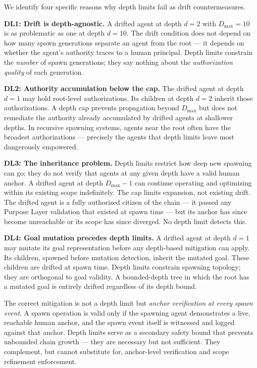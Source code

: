 We identify four specific reasons why depth limits fail as drift countermeasures.

\bigskip
\noindent\textbf{DL1: Drift is depth-agnostic.} A drifted agent at depth $d=2$ with $D_{\max}=10$ is as problematic as one at depth $d=10$. The drift condition does not depend on how many spawn generations separate an agent from the root — it depends on whether the agent's authority traces to a human principal. Depth limits constrain the \emph{number} of spawn generations; they say nothing about the \emph{authorization quality} of each generation.

\bigskip
\noindent\textbf{DL2: Authority accumulation below the cap.} The drifted agent at depth $d=1$ may hold root-level authorizations. Its children at depth $d=2$ inherit those authorizations. A depth cap prevents propagation beyond $D_{\max}$ but does not remediate the authority already accumulated by drifted agents at shallower depths. In recursive spawning systems, agents near the root often have the broadest authorizations — precisely the agents that depth limits leave most dangerously empowered.

\bigskip
\noindent\textbf{DL3: The inheritance problem.} Depth limits restrict how deep new spawning can go; they do not verify that agents at any given depth have a valid human anchor. A drifted agent at depth $D_{\max}-1$ can continue operating and optimizing within its existing scope indefinitely. The cap limits expansion, not existing drift. The drifted agent is a fully authorized citizen of the chain — it passed any Purpose Layer validation that existed at spawn time — but its anchor has since become unreachable or its scope has since diverged. No depth limit detects this.

\bigskip
\noindent\textbf{DL4: Goal mutation precedes depth limits.} A drifted agent at depth $d=1$ may mutate its goal representation before any depth-based mitigation can apply. Its children, spawned before mutation detection, inherit the mutated goal. These children are drifted at spawn time. Depth limits constrain spawning topology; they are orthogonal to goal validity. A bounded-depth tree in which the root has a mutated goal is entirely drifted regardless of its depth bound.

\bigskip
The correct mitigation is not a depth limit but \emph{anchor verification at every spawn event}. A spawn operation is valid only if the spawning agent demonstrates a live, reachable human anchor, and the spawn event itself is witnessed and logged against that anchor. Depth limits serve as a secondary safety bound that prevents unbounded chain growth — they are necessary but not sufficient. They complement, but cannot substitute for, anchor-level verification and scope refinement enforcement.

